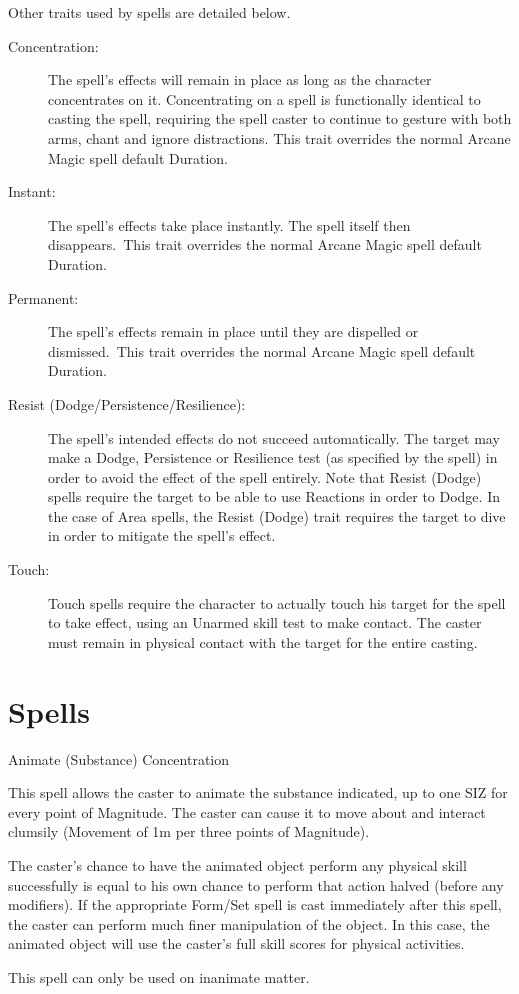 Other traits used by spells are detailed below. 
\begin{description}
	\item[Concentration:] The spell’s effects will remain in place as long as the character concentrates on it. Concentrating on a spell is functionally identical to casting the spell, requiring the spell caster to continue to gesture with both arms, chant and ignore distractions. This trait overrides the normal Arcane Magic spell default Duration. 
	\item[Instant:] The spell’s effects take place instantly. The spell itself then disappears. This trait overrides the normal Arcane Magic spell default Duration. 
	\item[Permanent:] The spell’s effects remain in place until they are dispelled or dismissed. This trait overrides the normal Arcane Magic spell default Duration.
	\item[Resist (Dodge/Persistence/Resilience):] The spell’s intended effects do not succeed automatically. The target may make a Dodge, Persistence or Resilience test (as specified by the spell) in order to avoid the effect of the spell entirely. Note that Resist (Dodge) spells require the target to be able to use Reactions in order to Dodge. In the case of Area spells, the Resist (Dodge) trait requires the target to dive in order to mitigate the spell’s effect. 
	\item[Touch:] Touch spells require the character to actually touch his target for the spell to take effect, using an Unarmed skill test to make contact. The caster must remain in physical contact with the target for the entire casting.
\end{description}

\section{Spells}

\begin{samepage}
\begin{rpg-spell}
{Animate (Substance)}
{Concentration}

This spell allows the caster to animate the substance indicated, up to one SIZ for every point of Magnitude. The caster can cause it to move about and interact clumsily (Movement of 1m per three points of Magnitude). 

The caster’s chance to have the animated object perform any physical skill successfully is equal to his own chance to perform that action halved (before any modifiers). If the appropriate Form/Set spell is cast immediately after this spell, the caster can perform much finer manipulation of the object. In this case, the animated object will use the caster’s full skill scores for physical activities. 

This spell can only be used on inanimate matter. 
\end{rpg-spell}
\end{samepage}


